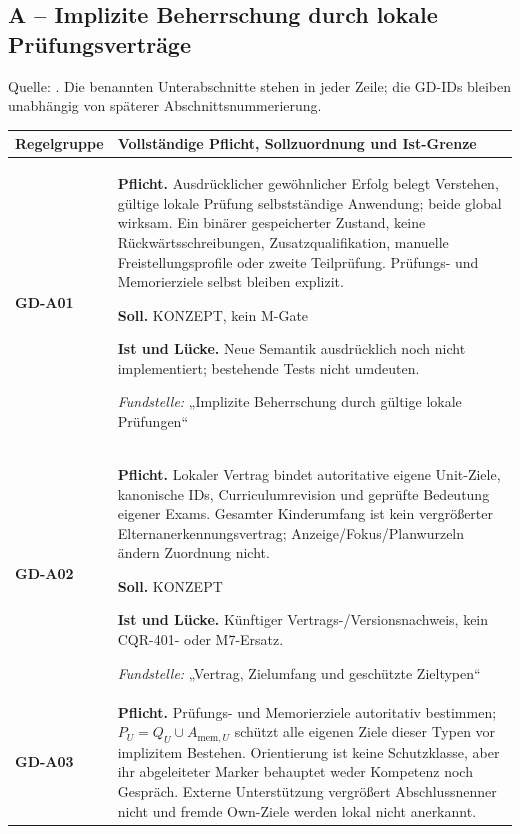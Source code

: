 \subsection{A -- Implizite Beherrschung durch lokale Prüfungsverträge}
Quelle: . Die benannten Unterabschnitte stehen in jeder Zeile; die GD-IDs bleiben unabhängig von späterer Abschnittsnummerierung.

\begingroup\small
\begin{longtable}{@{}P{20mm}P{128mm}@{}}
\toprule
Regelgruppe & Vollständige Pflicht, Sollzuordnung und Ist-Grenze\\
\midrule\endhead
{}\label{rule:GD-A01}\textbf{GD-A01} &
\textbf{Pflicht.} Ausdrücklicher gewöhnlicher Erfolg belegt Verstehen, gültige lokale Prüfung selbstständige Anwendung; beide global wirksam. Ein binärer gespeicherter Zustand, keine Rückwärtsschreibungen, Zusatzqualifikation, manuelle Freistellungsprofile oder zweite Teilprüfung. Prüfungs- und Memorierziele selbst bleiben explizit.\par\smallskip
\textbf{Soll.} KONZEPT, kein M-Gate\par\smallskip
\textbf{Ist und Lücke.} Neue Semantik ausdrücklich noch nicht implementiert; bestehende Tests nicht umdeuten.\par\smallskip
\emph{Fundstelle:} „Implizite Beherrschung durch gültige lokale Prüfungen“\\\addlinespace[5pt]
\label{rule:GD-A02}\textbf{GD-A02} &
\textbf{Pflicht.} Lokaler Vertrag bindet autoritative eigene Unit-Ziele, kanonische IDs, Curriculumrevision und geprüfte Bedeutung eigener Exams. Gesamter Kinderumfang ist kein vergrößerter Elternanerkennungsvertrag; Anzeige/Fokus/Planwurzeln ändern Zuordnung nicht.\par\smallskip
\textbf{Soll.} KONZEPT\par\smallskip
\textbf{Ist und Lücke.} Künftiger Vertrags-/Versionsnachweis, kein CQR-401- oder M7-Ersatz.\par\smallskip
\emph{Fundstelle:} „Vertrag, Zielumfang und geschützte Zieltypen“\\\addlinespace[5pt]
\label{rule:GD-A03}\textbf{GD-A03} &
\textbf{Pflicht.} Prüfungs- und Memorierziele autoritativ bestimmen; \(P_U=Q_U\cup A_{\mathrm{mem},U}\) schützt alle eigenen Ziele dieser Typen vor implizitem Bestehen. Orientierung ist keine Schutzklasse, aber ihr abgeleiteter Marker behauptet weder Kompetenz noch Gespräch. Externe Unterstützung vergrößert Abschlussnenner nicht und fremde Own-Ziele werden lokal nicht anerkannt.\par\smallskip

\end{longtable}
